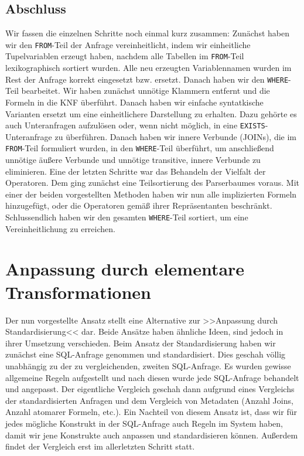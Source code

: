 \subsection{Abschluss}

Wir fassen die einzelnen Schritte noch einmal kurz zusammen: Zunächst haben wir den \verb|FROM|-Teil der Anfrage vereinheitlicht, indem wir einheitliche Tupelvariablen erzeugt haben, nachdem alle Tabellen im \verb|FROM|-Teil lexikographisch sortiert wurden. Alle neu erzeugten Variablennamen wurden im Rest der Anfrage korrekt eingesetzt bzw. ersetzt. Danach haben wir den \verb|WHERE|-Teil bearbeitet. Wir haben zunächst unnötige Klammern entfernt und die Formeln in die KNF überführt. Danach haben wir einfache syntatkische Varianten ersetzt um eine einheitlichere Darstellung zu erhalten. Dazu gehörte es auch Unteranfragen aufzulösen oder, wenn nicht möglich, in eine \verb|EXISTS|-Unteranfrage zu überführen. Danach haben wir innere Verbunde (JOINs), die im \verb|FROM|-Teil formuliert wurden, in den \verb|WHERE|-Teil überführt, um anschließend unnötige äußere Verbunde und unnötige transitive, innere Verbunde  zu eliminieren. Eine der letzten Schritte war das Behandeln der Vielfalt der Operatoren. Dem ging zunächst eine Teilsortierung des Parserbaumes voraus. Mit einer der beiden vorgestellten Methoden haben wir nun alle implizierten Formeln hinzugefügt, oder die Operatoren gemäß ihrer Repräsentanten beschränkt. Schlussendlich haben wir den gesamten \verb|WHERE|-Teil sortiert, um eine Vereinheitlichung zu erreichen.

\section{Anpassung durch elementare Transformationen}

Der nun vorgestellte Ansatz stellt eine Alternative zur >>Anpassung durch Standardisierung<< dar. Beide Ansätze haben ähnliche Ideen, sind jedoch in ihrer Umsetzung verschieden. Beim Ansatz der Standardisierung haben wir zunächst eine SQL-Anfrage genommen und standardisiert. Dies geschah völlig unabhängig zu der zu vergleichenden, zweiten SQL-Anfrage. Es wurden gewisse allgemeine Regeln aufgestellt und nach diesen wurde jede SQL-Anfrage behandelt und angepasst. Der eigentliche Vergleich geschah dann aufgrund eines Vergleichs der standardisierten Anfragen und dem Vergleich von Metadaten (Anzahl Joins, Anzahl atomarer Formeln, etc.). Ein Nachteil von diesem Ansatz ist, dass wir für jedes mögliche Konstrukt in der SQL-Anfrage auch Regeln im System haben, damit wir jene Konstrukte auch anpassen und standardisieren können. Außerdem findet der Vergleich erst im allerletzten Schritt statt.

